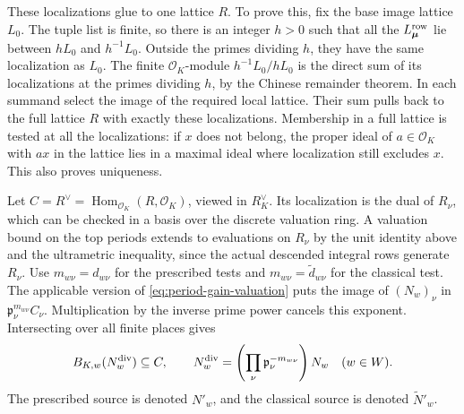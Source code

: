These localizations glue to one lattice \(R\). To prove this, fix
the base image lattice \(L_0\). The tuple list is finite, so
there is an integer \(h>0\) such that all the \(L_{\boldsymbol\mu}^{\rm row}\)
lie between \(hL_0\) and \(h^{-1}L_0\). Outside the primes dividing
\(h\), they have the same localization as \(L_0\).
The finite \(\mathcal O_K\)-module \(h^{-1}L_0/hL_0\)
is the direct sum of its localizations at the primes dividing
\(h\), by the Chinese remainder theorem. In each summand select
the image of the required local lattice. Their sum pulls back to
the full lattice \(R\) with exactly these localizations. Membership in
a full lattice is tested at all the localizations: if \(x\) does
not belong, the proper ideal of \(a\in\mathcal O_K\) with \(ax\)
in the lattice lies in a maximal ideal where localization still
excludes \(x\). This also proves uniqueness.

Let \(C=R^\vee=\operatorname{Hom}_{\mathcal O_K}(R,\mathcal O_K)\),
viewed in \(R_K^\vee\). Its localization is the dual of \(R_\nu\),
which can be checked in a basis over the discrete valuation ring.
A valuation bound on the top periods extends to evaluations on
\(R_\nu\) by the unit identity above and the ultrametric inequality,
since the actual descended integral rows generate \(R_\nu\).
Use \(m_{w\nu}=d_{w\nu}\) for the prescribed tests and
\(m_{w\nu}=\widetilde d_{w\nu}\) for the classical test.
The applicable version of \eqref{eq:period-gain-valuation} puts
the image of \((N_w)_\nu\) in \(\mathfrak p_\nu^{m_{w\nu}}C_\nu\).
Multiplication by the inverse prime power cancels this exponent.
Intersecting over all finite places gives
\begin{equation}
\label{eq:period-lattice}
 B_{K,w}(N_w^{\rm div})\subseteq C,\qquad
 N_w^{\rm div}=
 \left(\prod_\nu\mathfrak p_\nu^{-m_{w\nu}}\right)N_w
 \quad (w\in W).
\end{equation}
The prescribed source is denoted \(N'_w\), and the classical source
is denoted \(\widetilde N'_w\).


